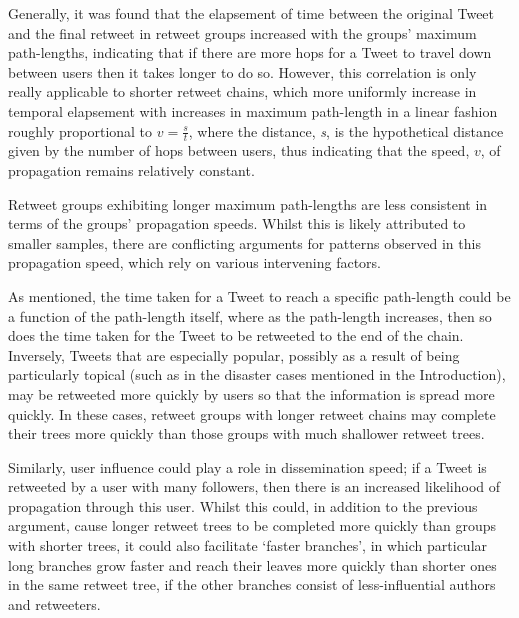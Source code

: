 
Generally, it was found that the elapsement of time between the original Tweet and the final retweet in retweet groups increased with the groups' maximum path-lengths, indicating that if there are more hops for a Tweet to travel down between users then it takes longer to do so. However, this correlation is only really applicable to shorter retweet chains, which more uniformly increase in temporal elapsement with increases in maximum path-length in a linear fashion roughly proportional to $ v=\frac{s}{t} $, where the distance, \textit{s}, is the hypothetical distance given by the number of hops between users, thus indicating that the speed, $v$, of propagation remains relatively constant. 

Retweet groups exhibiting longer maximum path-lengths are less consistent in terms of the groups' propagation speeds. Whilst this is likely attributed to smaller samples, there are conflicting arguments for patterns observed in this propagation speed, which rely on various intervening factors. 

As mentioned, the time taken for a Tweet to reach a specific path-length could be a function of the path-length itself, where as the path-length increases, then so does the time taken for the Tweet to be retweeted to the end of the chain. Inversely, Tweets that are especially popular, possibly as a result of being particularly topical (such as in the disaster cases mentioned in the Introduction), may be retweeted more quickly by users so that the information is spread more quickly. In these cases, retweet groups with longer retweet chains may complete their trees more quickly than those groups with much shallower retweet trees.

Similarly, user influence could play a role in dissemination speed; if a Tweet is retweeted by a user with many followers, then there is an increased likelihood of propagation through this user. Whilst this could, in addition to the previous argument, cause longer retweet trees to be completed more quickly than groups with shorter trees, it could also facilitate `faster branches', in which particular long branches grow faster and reach their leaves more quickly than shorter ones in the same retweet tree, if the other branches consist of less-influential authors and retweeters.

